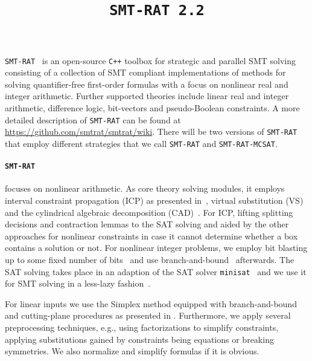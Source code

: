 \documentclass{article}
\title{\texttt{SMT-RAT 2.2}}
\begin{document}
\maketitle

\texttt{SMT-RAT}~\cite{Corzilius2015} is an open-source \texttt{C++} toolbox for strategic and parallel SMT solving
consisting of a collection of SMT compliant implementations of methods for
solving quantifier-free first-order formulas with a focus on nonlinear real and integer arithmetic.
Further supported theories include linear real and integer arithmetic, difference logic, bit-vectors and pseudo-Boolean constraints.
A more detailed description of \texttt{SMT-RAT} can be found at \href{https://github.com/smtrat/smtrat/wiki}{\color{blue}https://github.com/smtrat/smtrat/wiki}.
There will be two versions of \texttt{SMT-RAT} that employ different strategies that we call \texttt{SMT-RAT} and \texttt{SMT-RAT-MCSAT}.

\paragraph{\texttt{SMT-RAT}} focuses on nonlinear arithmetic.
As core theory solving modules, it employs interval constraint propagation (ICP) as presented in~\cite{GGIGSC10}, virtual substitution (VS)~\cite{Article_Corzilius_FCT2011} and the cylindrical algebraic decomposition (CAD)~\cite{Article_Loup_TubeCAD}. For ICP, lifting splitting decisions and contraction lemmas to the SAT solving and aided by the other approaches for nonlinear constraints in case it cannot determine whether a box contains a solution or not. For nonlinear integer problems, we employ bit blasting up to some fixed number of bits~\cite{kruger2015bitvectors} and use branch-and-bound~\cite{Kremer2016} afterwards.
The SAT solving takes place in an adaption of the SAT solver \texttt{minisat}~\cite{minisat} and we use it for SMT solving in a less-lazy fashion~\cite{sebastiani2007lazy}.

For linear inputs we use the Simplex method equipped with branch-and-bound and cutting-plane procedures as presented in \cite{DM06}.
Furthermore, we apply several preprocessing techniques, e.g., using factorizations to simplify constraints, applying substitutions gained by constraints being equations or breaking symmetries. We also normalize and simplify formulas if it is obvious.

\end{document}
